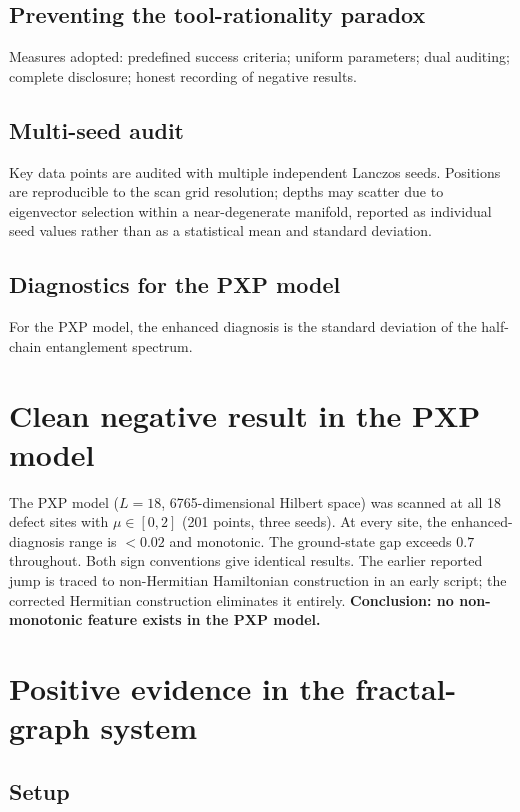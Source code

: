\documentclass[aps,prb,reprint,superscriptaddress]{revtex4-2}
\begin{document}
\subsection{Preventing the tool-rationality paradox}

Measures adopted: predefined success criteria; uniform parameters; dual auditing; complete disclosure; honest recording of negative results.

\subsection{Multi-seed audit}

Key data points are audited with multiple independent Lanczos seeds. Positions are reproducible to the scan grid resolution; depths may scatter due to eigenvector selection within a near-degenerate manifold, reported as individual seed values rather than as a statistical mean and standard deviation.

\subsection{Diagnostics for the PXP model}

For the PXP model, the enhanced diagnosis is the standard deviation of the half-chain entanglement spectrum.

\section{Clean negative result in the PXP model}

The PXP model ($L=18$, 6765-dimensional Hilbert space) was scanned at all 18 defect sites with $\mu\in[0,2]$ (201 points, three seeds). At every site, the enhanced-diagnosis range is $<0.02$ and monotonic. The ground-state gap exceeds $0.7$ throughout. Both sign conventions give identical results. The earlier reported jump is traced to non-Hermitian Hamiltonian construction in an early script; the corrected Hermitian construction eliminates it entirely. \textbf{Conclusion: no non-monotonic feature exists in the PXP model.}

\section{Positive evidence in the fractal-graph system}

\subsection{Setup}
\end{document}
